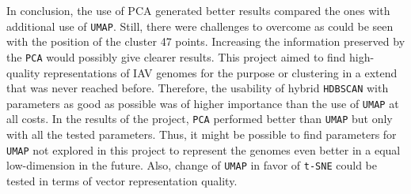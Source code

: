 \vspace{1em}

In conclusion, the use of PCA generated better results compared the ones with additional use of \texttt{UMAP}. Still, there were challenges to overcome as could be seen with the position of the cluster 47 points. Increasing the information preserved by the \texttt{PCA} would possibly give clearer results. This project aimed to find high-quality representations of \gls{IAV} genomes for the purpose or clustering in a extend that was never reached before. Therefore, the usability of hybrid \texttt{HDBSCAN} with parameters as good as possible was of higher importance than the use of \texttt{UMAP} at all costs. In the results of the project, \texttt{PCA} performed better than \texttt{UMAP} but only with all the tested parameters. Thus, it might be possible to find parameters for \texttt{UMAP} not explored in this project to represent the genomes even better in a equal low-dimension in the future. Also, change of \texttt{UMAP} in favor of \texttt{t-SNE} could be tested in terms of vector representation quality.